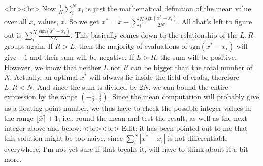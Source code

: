 <br><br>
Now $\frac{1}{N}\sum_i^N x_i$ is just the mathematical definition of the mean value over all $x_i$ values, $\bar{x}$. So we get $x^\ast = \bar{x} - \sum_i^N \frac{\text{sgn}(x^\ast-x_i)}{2N}$. All that's left to figure out is $\sum_i^N \frac{\text{sgn}(x^\ast-x_i)}{2N}$. This basically comes down to the relationship of the $L,R$ groups again. If $R > L$, then the majority of evaluations of $\text{sgn}(x^\ast-x_i)$ will give $-1$ and their sum will be negative. If $L > R$, the sum will be positive. However, we know that neither $L$ nor $R$ can be bigger than the total number of $N$. Actually, an optimal $x^\ast$ will always lie inside the field of crabs, therefore $L,R < N$. And since the sum is divided by $2N$, we can bound the entire expression by the range $(-\frac{1}{2},\frac{1}{2})$. Since the mean computation will probably give us a floating point number, we thus have to check the possible integer values in the range $\lfloor \bar{x} \rceil \pm 1$, i.e., round the mean and test the result, as well as the next integer above and below.
<br><br>
Edit: it has been pointed out to me that this solution might be too naive, since $\sum_i^N|x^\ast-x_i|$ is not differentiable everywhere. I'm not yet sure if that breaks it, will have to think about it a bit more.